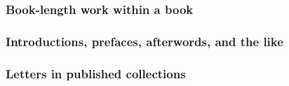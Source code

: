 \documentclass[11pt,letterpaper,oneside]{article}
\begin{document}


\begin{citebib}
\item \cite[84--87]{keating1968}
\item \cite[362--70]{lippincott1968}
\item \cite[107--19]{draper1987}
\item \cite[189--207]{harrington1987}
\nocite{angle1968,zukowsky1987}
\end{citebib}

\subsubsection{Book-length work within a book}
\label{14.109}

\begin{citebib}
\item \cite{bernard1990a}
\item \cite{updike1995a}
\end{citebib}

\subsubsection{Introductions, prefaces, afterwords, and the like}


\begin{citebib}
\item \cite{morrison2004b.f}
\item \cite{mansfield2000}
\end{citebib}

\subsubsection{Letters in published collections}
\end{document}
